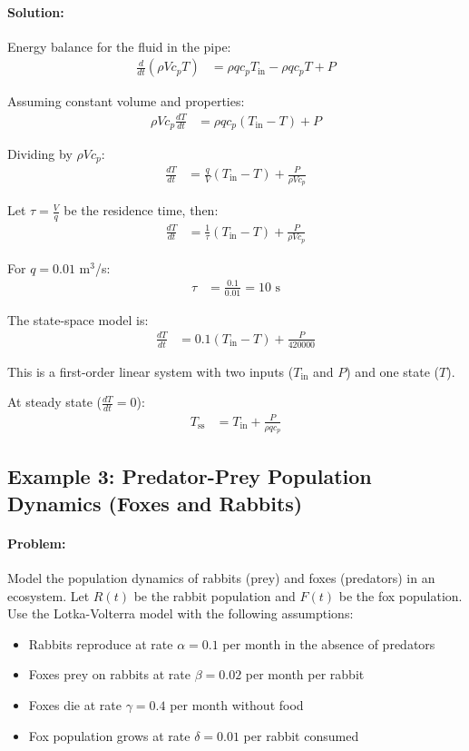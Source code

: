 \documentclass[11pt,a4paper]{article}
\begin{document}
\paragraph{Solution:}

Energy balance for the fluid in the pipe:
\begin{align}
  \frac{d}{dt}(\rho V c_p T) &= \rho q c_p T_{\text{in}} - \rho q c_p T + P
\end{align}

Assuming constant volume and properties:
\begin{align}
  \rho V c_p \frac{dT}{dt} &= \rho q c_p (T_{\text{in}} - T) + P
\end{align}

Dividing by $\rho V c_p$:
\begin{align}
  \frac{dT}{dt} &= \frac{q}{V}(T_{\text{in}} - T) + \frac{P}{\rho V c_p}
\end{align}

Let $\tau = \frac{V}{q}$ be the residence time, then:
\begin{align}
  \frac{dT}{dt} &= \frac{1}{\tau}(T_{\text{in}} - T) + \frac{P}{\rho V c_p}
\end{align}

For $q = 0.01$ m$^3$/s:
\begin{align}
  \tau &= \frac{0.1}{0.01} = 10 \text{ s}
\end{align}

The state-space model is:
\begin{align}
  \frac{dT}{dt} &= 0.1(T_{\text{in}} - T) + \frac{P}{420000}
\end{align}

This is a first-order linear system with two inputs ($T_{\text{in}}$ and $P$) and one state ($T$).

At steady state ($\frac{dT}{dt} = 0$):
\begin{align}
  T_{\text{ss}} &= T_{\text{in}} + \frac{P}{\rho q c_p}
\end{align}

\subsection{Example 3: Predator-Prey Population Dynamics (Foxes and Rabbits)}

\paragraph{Problem:} Model the population dynamics of rabbits (prey) and foxes (predators) in an ecosystem. Let $R(t)$ be the rabbit population and $F(t)$ be the fox population. Use the Lotka-Volterra model with the following assumptions:
\begin{itemize}
  \item Rabbits reproduce at rate $\alpha = 0.1$ per month in the absence of predators
  \item Foxes prey on rabbits at rate $\beta = 0.02$ per month per rabbit
  \item Foxes die at rate $\gamma = 0.4$ per month without food
  \item Fox population grows at rate $\delta = 0.01$ per rabbit consumed
\end{itemize}
\end{document}
